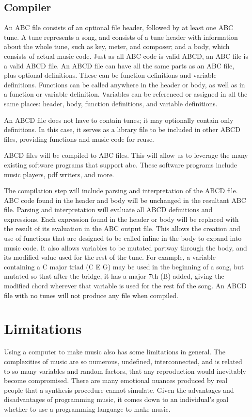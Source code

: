 \subsection{Compiler}
An ABC file consists of an optional file header, followed by at least one ABC tune. A tune represents a song, and consists of a tune header with information about the whole tune, such as key, meter, and composer; and a body, which consists of actual music code\cite{Walshaw11}. Just as all ABC code is valid ABCD, an ABC file is a valid ABCD file. An ABCD file can have all the same parts as an ABC file, plus optional definitions. These can be function definitions and variable definitions. Functions can be called anywhere in the header or body, as well as in a function or variable definition. Variables can be referenced or assigned in all the same places: header, body, function definitions, and variable definitions.
	
An ABCD file does not have to contain tunes; it may optionally contain only definitions. In this case, it serves as a library file to be included in other ABCD files, providing functions and music code for reuse.
	
ABCD files will be compiled to ABC files. This will allow us to leverage the many existing software programs that support abc\cite{Walshaw17}. These software programs include music players, pdf writers, and more.

The compilation step will include parsing and interpretation of the ABCD file. ABC code found in the header and body will be unchanged in the resultant ABC file. Parsing and interpretation will evaluate all ABCD definitions and expressions. Each expression found in the header or body will be replaced with the result of its evaluation in the ABC output file. This allows the creation and use of functions that are designed to be called inline in the body to expand into music code. It also allows variables to be mutated partway through the body, and its modified value used for the rest of the tune. For example, a variable containing a C major triad (C E G) may be used in the beginning of a song, but mutated so that after the bridge, it has a major 7th (B) added, giving the modified chord wherever that variable is used for the rest fof the song. An ABCD file with no tunes will not produce any file when compiled.

\section{Limitations}
Using a computer to make music also has some limitations in general. The complexities of music are so numerous, undefined, interconnected, and is related to so many variables and random factors, that any reproduction would inevitably become compromised. There are many emotional nuances produced by real people that a synthesis procedure cannot simulate\cite{Dobrian88}.  Given the advantages and disadvantages of programming music, it comes down to an individual's goal whether to use a programming language to make music. 

